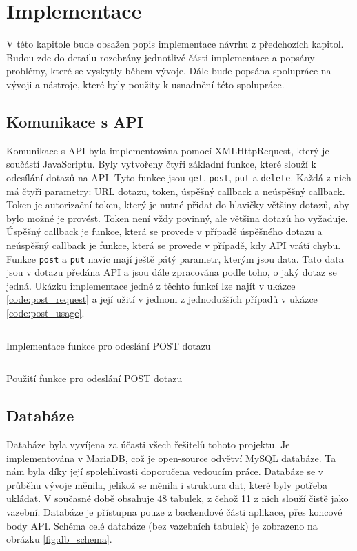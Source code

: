 \chapter{Implementace}
V této kapitole bude obsažen popis implementace návrhu z předchozích kapitol. Budou zde do detailu rozebrány jednotlivé části implementace a popsány problémy, které se vyskytly během vývoje. Dále bude popsána spolupráce na vývoji a nástroje, které byly použity k usnadnění této spolupráce.

\section{Komunikace s API}
Komunikace s API byla implementována pomocí XMLHttpRequest, který je součástí JavaScriptu. Byly vytvořeny čtyři základní funkce, které slouží k odesílání dotazů na API. Tyto funkce jsou \texttt{get}, \texttt{post}, \texttt{put} a \texttt{delete}. Každá z nich má čtyři parametry: URL dotazu, token, úspěšný callback a neúspěšný callback. Token je autorizační token, který je nutné přidat do hlavičky většiny dotazů, aby bylo možné je provést. Token není vždy povinný, ale většina dotazů ho vyžaduje. Úspěšný callback je funkce, která se provede v případě úspěšného dotazu a neúspěšný callback je funkce, která se provede v případě, kdy API vrátí chybu. Funkce \texttt{post} a \texttt{put} navíc mají ještě pátý parametr, kterým jsou data. Tato data jsou v dotazu předána API a jsou dále zpracována podle toho, o jaký dotaz se jedná. Ukázku implementace jedné z těchto funkcí lze najít v ukázce \ref{code:post_request} a její užití v jednom z jednodužších případů v ukázce \ref{code:post_usage}.

\begin{listing}[H]
  \inputminted[breaklines]{typescript}{resources/code/post_request.ts}
  \caption{Implementace funkce pro odeslání POST dotazu}
  \label{code:post_request}
\end{listing}

\begin{listing}[H]
  \inputminted[breaklines]{typescript}{resources/code/post_usage.ts}
  \caption{Použití funkce pro odeslání POST dotazu}
  \label{code:post_usage}
\end{listing}


\section{Databáze}
Databáze byla vyvíjena za účasti všech řešitelů tohoto projektu. Je implementována v MariaDB, což je open-source odvětví MySQL databáze. Ta nám byla díky její spolehlivosti doporučena vedoucím práce. Databáze se v průběhu vývoje měnila, jelikož se měnila i struktura dat, které byly potřeba ukládat. V současné době obsahuje 48 tabulek, z čehož 11 z nich slouží čistě jako vazební. Databáze je přístupna pouze z backendové části aplikace, přes koncové body API. Schéma celé databáze (bez vazebních tabulek) je zobrazeno na obrázku \ref{fig:db_schema}.

